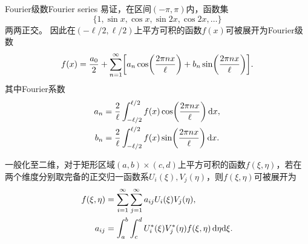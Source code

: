 \begin{example}{Fourier级数}{Fourier series}
    易证，在区间$(-\pi,\pi)$内，函数集
    \[
        \{1,\sin x,\cos x,\sin 2x,\cos 2x,\ldots\}
    \]
    两两正交。
    因此在$(-\ell/2,\ell/2)$上平方可积的函数$f(x)$可被展开为Fourier级数
    \begin{equation}
        f(x) = \frac{a_0}2 + \sum_{n=1}^\infty\biggl[a_n\cos\biggl(\frac{2\pi nx}{\ell}\biggr) + b_n\sin\biggl(\frac{2\pi nx}{\ell}\biggr)\biggr].
    \end{equation}
    其中Fourier系数
    \begin{subequations}
        \label{eq:ed-real-fourier-coefficients}
        \begin{align}
            a_n &= \frac2\ell\int_{-\ell/2}^{\ell/2}f(x)\cos\biggl(\frac{2\pi nx}{\ell}\biggr)\mathop{}\!\mathrm{d} x,\\
            b_n &= \frac2\ell\int_{-\ell/2}^{\ell/2}f(x)\sin\biggl(\frac{2\pi nx}{\ell}\biggr)\mathop{}\!\mathrm{d} x.
        \end{align}
    \end{subequations}
\end{example}
一般化至二维，对于矩形区域$(a,b) \times (c,d)$上平方可积的函数$f(\xi,\eta)$，若在两个维度分别取完备的正交归一函数系$U_i(\xi),V_j(\eta)$，则$f(\xi,\eta)$可被展开为
\begin{subequations}
    \label{eq:ed-product-basis-expansion}
    \begin{align}
        f(\xi,\eta) &= \sum_{i=1}^\infty\sum_{j=1}^\infty a_{ij}U_i(\xi)V_j(\eta),\\
        a_{ij} &= \int_a^b\int_c^dU_i^\ast(\xi)V_j^\ast(\eta)f(\xi,\eta)\mathop{}\!\mathrm{d}\eta\mathrm{d}\xi .
    \end{align}
\end{subequations}
